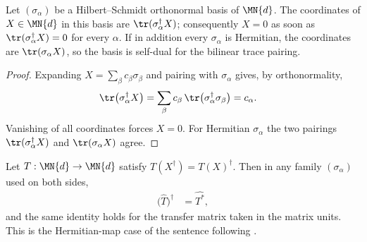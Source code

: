 \begin{lemma}
    \label{lem:hilbert_schmidt_orthonormal_coordinates}
    \leanok
    Let $(\sigma_\alpha)$ be a Hilbert--Schmidt orthonormal basis of $\MN{d}$.
    The coordinates of $X\in\MN{d}$ in this basis are
    $\tr(\sigma_\alpha^\dagger X)$; consequently $X=0$ as soon as
    $\tr(\sigma_\alpha^\dagger X)=0$ for every $\alpha$. If in addition every
    $\sigma_\alpha$ is Hermitian, the coordinates are $\tr(\sigma_\alpha X)$, so
    the basis is self-dual for the bilinear trace pairing.
\end{lemma}

\begin{proof}\leanok
    Expanding $X=\sum_\beta c_\beta\sigma_\beta$ and pairing with
    $\sigma_\alpha$ gives, by orthonormality,
    \begin{align}
        \tr\bigl(\sigma_\alpha^\dagger X\bigr)
        &= \sum_\beta c_\beta\,\tr\bigl(\sigma_\alpha^\dagger\sigma_\beta\bigr)
         = c_\alpha.
    \end{align}
    Vanishing of all coordinates forces $X=0$. For Hermitian $\sigma_\alpha$ the
    two pairings $\tr(\sigma_\alpha^\dagger X)$ and $\tr(\sigma_\alpha X)$
    agree.
\end{proof}

\begin{lemma}
    \label{lem:transfer_matrix_of_basis_dual}
    \leanok
    Let $T:\MN{d}\to\MN{d}$ satisfy $T(X^\dagger)=T(X)^\dagger$. Then in any
    family $(\sigma_\alpha)$ used on both sides,
    \begin{align}
        \bigl(\widehat T\bigr)^\dagger &= \widehat{T^*},
    \end{align}
    and the same identity holds for the transfer matrix taken in the matrix
    units. This is the Hermitian-map case of the sentence following
    \cite[Equation~(2.20)]{Wolf2012Quantum}.
\end{lemma}

